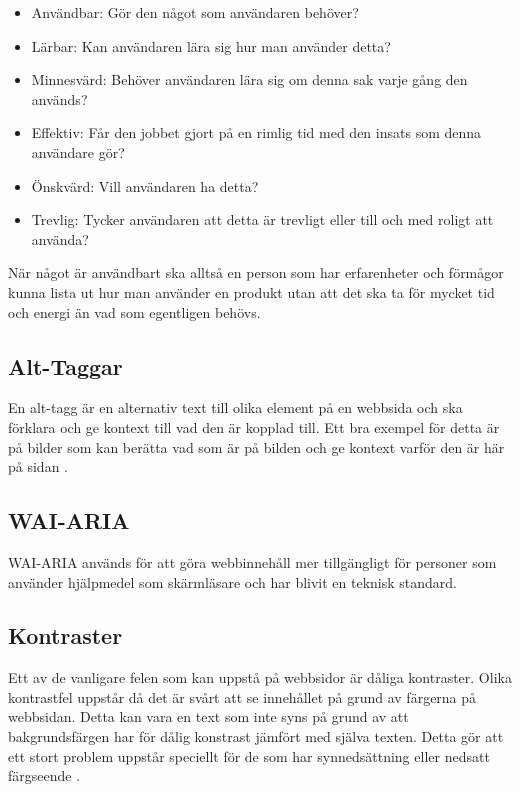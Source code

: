\documentclass[11p]{article}
\begin{document}
    \begin{itemize}
        \item Användbar: Gör den något som användaren behöver?
        \item Lärbar: Kan användaren lära sig hur man använder detta?
        \item Minnesvärd: Behöver användaren lära sig om denna sak varje gång den används?
        \item Effektiv: Får den jobbet gjort på en rimlig tid med den insats som denna användare gör?
        \item Önskvärd: Vill användaren ha detta?
        \item Trevlig: Tycker användaren att detta är trevligt eller till och med roligt att använda?
    \end{itemize}

    När något är användbart ska alltså en person som har erfarenheter och förmågor kunna lista ut hur man använder en produkt utan att det ska ta för mycket tid och energi än vad som egentligen behövs.

    \subsection{Alt-Taggar}
    En alt-tagg är en alternativ text till olika element på en webbsida och ska förklara och ge kontext till vad den är kopplad till.
    Ett bra exempel för detta är på bilder som kan berätta vad som är på bilden och ge kontext varför den är här på sidan \textcite{Nordström}.

    \subsection{WAI-ARIA}
    WAI-ARIA används för att göra webbinnehåll mer tillgängligt för personer som använder hjälpmedel som skärmläsare och har blivit en teknisk standard. \textcite{ARIA}


    \subsection{Kontraster}
    Ett av de vanligare felen som kan uppstå på webbsidor är dåliga kontraster.
    Olika kontrastfel uppstår då det är svårt att se innehållet på grund av färgerna på webbsidan.
    Detta kan vara en text som inte syns på grund av att bakgrundsfärgen har för dålig konstrast jämfört med själva texten.
    Detta gör att ett stort problem uppstår speciellt för de som har synnedsättning eller nedsatt färgseende \textcite{Digg_2021}.
\end{document}
